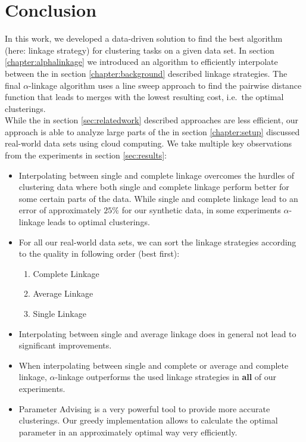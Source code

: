 \chapter{Conclusion}

In this work, we developed a data-driven solution to find the best algorithm (here: linkage strategy) for clustering tasks on a given data set. In section \ref{chapter:alphalinkage} we introduced an algorithm to efficiently interpolate between the in section \ref{chapter:background} described linkage strategies. The final $\alpha$-linkage algorithm uses a line sweep approach to find the pairwise distance function that leads to merges with the lowest resulting cost, i.e.\ the optimal clusterings.\\

While the in section \ref{sec:relatedwork} described approaches are less efficient, our approach is able to analyze large parts of the in section \ref{chapter:setup}  discussed real-world data sets using cloud computing. We take multiple key observations from the experiments in section \ref{sec:results}:
\begin{itemize}
\item Interpolating between single and complete linkage overcomes the hurdles of clustering data where both single and complete linkage perform better for some certain parts of the data. While single and complete linkage lead to an error of approximately $25\%$ for our synthetic data, in some experiments $\alpha$-linkage leads to optimal clusterings.
\item For all our real-world data sets, we can sort the linkage strategies according to the quality in following order (best first):
\begin{enumerate}
\item Complete Linkage
\item Average Linkage
\item Single Linkage
\end{enumerate}
\item Interpolating between single and average linkage does in general not lead to significant improvements.
\item When interpolating between single and complete or average and complete linkage, $\alpha$-linkage outperforms the used linkage strategies in \textbf{all} of our experiments.
\item Parameter Advising is a very powerful tool to provide more accurate clusterings. Our greedy implementation allows to calculate the optimal parameter in an approximately optimal way very efficiently.
\end{itemize}

